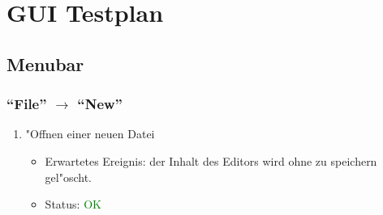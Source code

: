 \section{GUI Testplan}
\subsection{Menubar}
\subsubsection{"`File"' $\rightarrow$ "`New"'}
\begin{enumerate}
\item "Offnen einer neuen Datei
\begin{itemize}
\item Erwartetes Ereignis: der Inhalt des Editors wird ohne zu speichern gel"oscht. 
\item Status: \textcolor{green}{OK}
\end{itemize}
\end{enumerate}
